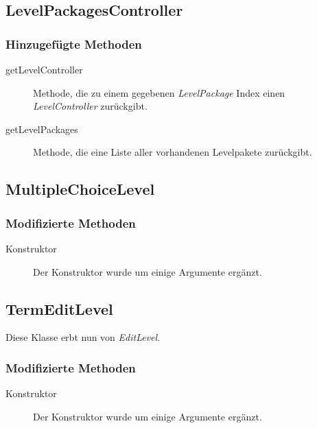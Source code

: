 \subsection{LevelPackagesController}

	\subsubsection{Hinzugefügte Methoden}
		\begin{description}
			\item[getLevelController] Methode, die zu einem gegebenen \emph{LevelPackage} Index einen
			 \emph{LevelController} zurückgibt. 
			\item[getLevelPackages] Methode, die eine Liste aller vorhandenen Levelpakete zurückgibt.
		\end{description}


\subsection{MultipleChoiceLevel}

	\subsubsection{Modifizierte Methoden}
		\begin{description}
			\item[Konstruktor] Der Konstruktor wurde um einige Argumente ergänzt.
		\end{description}



\subsection{TermEditLevel}
	Diese Klasse erbt nun von \emph{EditLevel}.

	\subsubsection{Modifizierte Methoden}
		\begin{description}
			\item[Konstruktor] Der Konstruktor wurde um einige Argumente ergänzt.
		\end{description}

